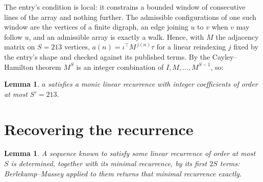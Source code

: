 \documentclass[11pt,a4paper]{article}
\theoremstyle{plain}
\newtheorem{lemma}[theorem]{Lemma}
\theoremstyle{definition}
\begin{document}
The entry's condition is local: it constrains a bounded window of consecutive lines of the
array and nothing further. The admissible configurations of one such window are the vertices
of a finite digraph, an edge joining $u$ to $v$ when $v$ may follow $u$, and an admissible
array is exactly a walk. Hence, with $M$ the adjacency matrix on $S=213$ vertices,
$a(n)=\iota^{\!\top}M^{\,j(n)}\tau$ for a linear reindexing $j$ fixed by the entry's shape
and checked against its published terms. By the Cayley--Hamilton theorem $M^{S}$ is an
integer combination of $I,M,\dots,M^{S-1}$, so:

\begin{lemma}\label{lem:cf}
$a$ satisfies a monic linear recurrence with integer coefficients of order at most
$S'=213$.
\end{lemma}

\section{Recovering the recurrence}

\begin{lemma}\label{lem:bm}
A sequence known to satisfy some linear recurrence of order at most $S$ is determined, together
with its minimal recurrence, by its first $2S$ terms: Berlekamp--Massey applied to them returns
that minimal recurrence exactly.
\end{lemma}
\end{document}
